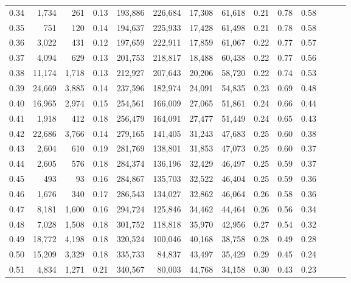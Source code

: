 \begin{tabular}{rrrrrrrrrrrrrr}
0.34 &   1,734 &    261 &  0.13 &  193,886 &  226,684 &  17,308 &  61,618 &  0.21 &  0.78 &      0.58 \\
0.35 &     751 &    120 &  0.14 &  194,637 &  225,933 &  17,428 &  61,498 &  0.21 &  0.78 &      0.58 \\
0.36 &   3,022 &    431 &  0.12 &  197,659 &  222,911 &  17,859 &  61,067 &  0.22 &  0.77 &      0.57 \\
0.37 &   4,094 &    629 &  0.13 &  201,753 &  218,817 &  18,488 &  60,438 &  0.22 &  0.77 &      0.56 \\
0.38 &  11,174 &  1,718 &  0.13 &  212,927 &  207,643 &  20,206 &  58,720 &  0.22 &  0.74 &      0.53 \\
0.39 &  24,669 &  3,885 &  0.14 &  237,596 &  182,974 &  24,091 &  54,835 &  0.23 &  0.69 &      0.48 \\
0.40 &  16,965 &  2,974 &  0.15 &  254,561 &  166,009 &  27,065 &  51,861 &  0.24 &  0.66 &      0.44 \\
0.41 &   1,918 &    412 &  0.18 &  256,479 &  164,091 &  27,477 &  51,449 &  0.24 &  0.65 &      0.43 \\
0.42 &  22,686 &  3,766 &  0.14 &  279,165 &  141,405 &  31,243 &  47,683 &  0.25 &  0.60 &      0.38 \\
0.43 &   2,604 &    610 &  0.19 &  281,769 &  138,801 &  31,853 &  47,073 &  0.25 &  0.60 &      0.37 \\
0.44 &   2,605 &    576 &  0.18 &  284,374 &  136,196 &  32,429 &  46,497 &  0.25 &  0.59 &      0.37 \\
0.45 &     493 &     93 &  0.16 &  284,867 &  135,703 &  32,522 &  46,404 &  0.25 &  0.59 &      0.36 \\
0.46 &   1,676 &    340 &  0.17 &  286,543 &  134,027 &  32,862 &  46,064 &  0.26 &  0.58 &      0.36 \\
0.47 &   8,181 &  1,600 &  0.16 &  294,724 &  125,846 &  34,462 &  44,464 &  0.26 &  0.56 &      0.34 \\
0.48 &   7,028 &  1,508 &  0.18 &  301,752 &  118,818 &  35,970 &  42,956 &  0.27 &  0.54 &      0.32 \\
0.49 &  18,772 &  4,198 &  0.18 &  320,524 &  100,046 &  40,168 &  38,758 &  0.28 &  0.49 &      0.28 \\
0.50 &  15,209 &  3,329 &  0.18 &  335,733 &   84,837 &  43,497 &  35,429 &  0.29 &  0.45 &      0.24 \\
0.51 &   4,834 &  1,271 &  0.21 &  340,567 &   80,003 &  44,768 &  34,158 &  0.30 &  0.43 &      0.23 \\

\end{tabular}
